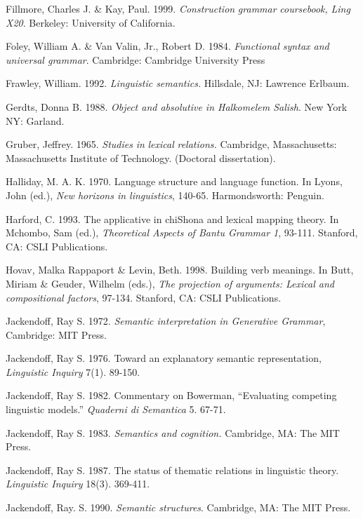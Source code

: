 \documentclass[output=paper]{langsci/langscibook}
\begin{document}
Fillmore, Charles J. \& Kay, Paul. 1999. \textit{Cons}\textit{t}\textit{r}\textit{u}\textit{c}\textit{ti}\textit{o}\textit{n}\textit{ }\textit{gra}\textit{mm}\textit{ar}\textit{ }\textit{co}\textit{u}\textit{rseboo}\textit{k,}\textit{ }\textit{Li}\textit{n}\textit{g}\textit{ }\textit{X20}. Berkeley: University of California.

Foley, William A. \& Van Valin, Jr., Robert D. 1984. \textit{Functional syntax and universal grammar}. Cambridge: Cambridge University Press

Frawley, William. 1992. \textit{Linguistic semantics.} Hillsdale, NJ: Lawrence Erlbaum.

Gerdts, Donna B. 1988. \textit{Object and absolutive in Halkomelem Salish}. New York NY: Garland.

Gruber, Jeffrey. 1965. \textit{Studies}\textit{ }\textit{in}\textit{ }\textit{lexical}\textit{ }\textit{relations. }Cambridge, Massachusetts: Massachusetts Institute of Technology. (Doctoral dissertation).

Halliday, M. A. K. 1970. Language structure and language function. In Lyons, John (ed.), \textit{New horizons in linguistics}, 140-65. Harmondsworth: Penguin.

Harford, C. 1993. The applicative in chiShona and lexical mapping theory. In Mchombo, Sam (ed.), \textit{Theoretical Aspects of Bantu Grammar 1}, 93-111. Stanford, CA: CSLI Publications.

Hovav, Malka Rappaport \& Levin, Beth. 1998. Building verb meanings. In Butt, Miriam \& Geuder, Wilhelm (eds.), \textit{The projection of arguments: Lexical and compositional factors}, 97-134. Stanford, CA: CSLI Publications.

Jackendoff, Ray S. 1972. \textit{Semantic interpretation in Generative Grammar}, Cambridge: MIT Press.

Jackendoff, Ray S. 1976. Toward an explanatory semantic representation, \textit{Linguistic Inquiry }7(1). 89-150.

Jackendoff, Ray S. 1982. Commentary on Bowerman, “Evaluating competing   linguistic models.” \textit{Quaderni di Semantica }5. 67-71.

Jackendoff, Ray S. 1983. \textit{Semantics and cognition.} Cambridge, MA: The MIT Press.

Jackendoff, Ray S. 1987. The status of thematic relations in linguistic theory. \textit{Linguistic Inquiry }18(3). 369-411.

Jackendoff, Ray. S. 1990. \textit{Semantic structures}. Cambridge, MA: The MIT Press.
\end{document}
